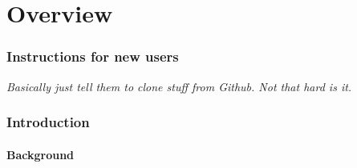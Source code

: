 \documentclass{article}
\begin{document}
\newpage
\tableofcontents

\newpage
{}
\part{Overview}

\section{Instructions for new users}

\textit{Basically just tell them to clone stuff from Github. Not that hard is it.}

\newpage
\section{Introduction}

\subsection{Background}
\end{document}

